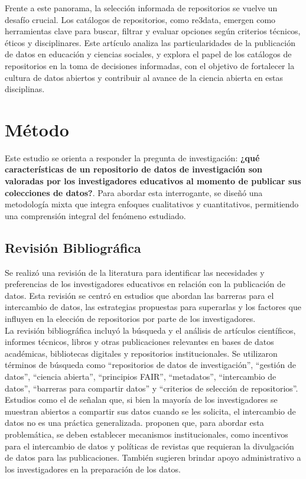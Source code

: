 \documentclass[runningheads]{llncs}
\begin{document}
Frente a este panorama, la selección informada de repositorios se vuelve un desafío crucial. Los catálogos de repositorios, como re3data, emergen como herramientas clave para buscar, filtrar y evaluar opciones según criterios técnicos, éticos y disciplinares. Este artículo analiza las particularidades de la publicación de datos en educación y ciencias sociales, y explora el papel de los catálogos de repositorios en la toma de decisiones informadas, con el objetivo de fortalecer la cultura de datos abiertos y contribuir al avance de la ciencia abierta en estas disciplinas.\\

\section{Método}

Este estudio se orienta a responder la pregunta de investigación: \textbf{¿qué características de un repositorio de datos de investigación son valoradas por los investigadores educativos al momento de publicar sus colecciones de datos?}. Para abordar esta interrogante, se diseñó una metodología mixta que integra enfoques cualitativos y cuantitativos, permitiendo una comprensión integral del fenómeno estudiado.\\

\subsection{Revisión Bibliográfica}
Se realizó una revisión de la literatura para identificar las necesidades y preferencias de los investigadores educativos en relación con la publicación de datos. Esta revisión se centró en estudios que abordan las barreras para el intercambio de datos, las estrategias propuestas para superarlas y los factores que influyen en la elección de repositorios por parte de los investigadores.\\
La revisión bibliográfica incluyó la búsqueda y el análisis de artículos científicos, informes técnicos, libros y otras publicaciones relevantes en bases de datos académicas, bibliotecas digitales y repositorios institucionales. Se utilizaron términos de búsqueda como ``repositorios de datos de investigación'', ``gestión de datos'', ``ciencia abierta'', ``principios FAIR'', ``metadatos'', ``intercambio de datos'', ``barreras para compartir datos'' y ``criterios de selección de repositorios''.\\

Estudios como el de \cite{barczak2022} señalan que, si bien la mayoría de los investigadores se muestran abiertos a compartir sus datos cuando se les solicita, el intercambio de datos no es una práctica generalizada. \cite{barczak2022} proponen que, para abordar esta problemática, se deben establecer mecanismos institucionales, como incentivos para el intercambio de datos y políticas de revistas que requieran la divulgación de datos para las publicaciones. También sugieren brindar apoyo administrativo a los investigadores en la preparación de los datos.\\
\end{document}
